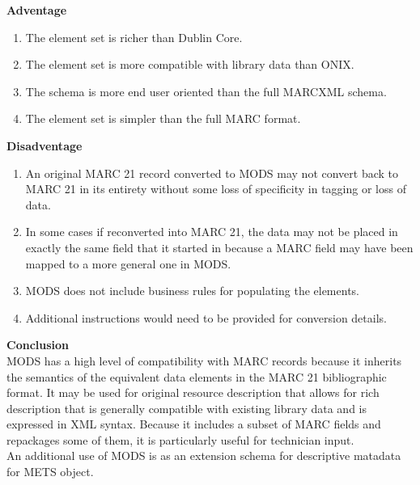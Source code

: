 \begin{enumerate}
	{\bf Adventage}
	\begin{enumerate}
		\item The element set is richer than Dublin Core.
		\item The element set is more compatible with library data than ONIX.
		\item The schema is more end user oriented than the full MARCXML schema.
		\item The element set is simpler than the full MARC format.
	\end{enumerate}	
	{\bf Disadventage}
	\begin{enumerate}
		\item An original MARC 21 record converted to MODS may not convert back to MARC 21 in its entirety without some loss of specificity in tagging or loss of data.
		\item In some cases if reconverted into MARC 21, the data may not be placed in exactly the same field that it started in because a MARC field may have been mapped to a more general one in MODS.
		\item MODS does not include business rules for populating the elements.
		\item Additional instructions would need to be provided for conversion details.
	\end{enumerate}
	{\bf Conclusion}\\
	MODS has a high level of compatibility with MARC records because it inherits the semantics of the equivalent data elements in the MARC 21 bibliographic format. It may be used for original resource description that allows for rich description that is generally compatible with existing library data and is expressed in XML syntax. Because it includes a subset of MARC fields and repackages some of them, it is particularly useful for technician input.\\
	An additional use of MODS is as an extension schema for descriptive matadata for METS object.
	
	

\end{enumerate}
